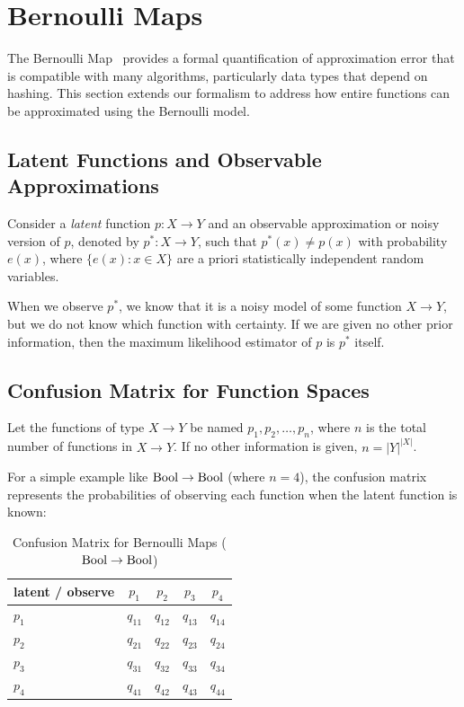 \documentclass[../main.tex]{subfiles}
\begin{document}
\section{Bernoulli Maps}
\label{sec:bernoulli_maps}

The Bernoulli Map~\cite{bernoulliMaps} provides a formal quantification of approximation error that is compatible with many algorithms, particularly data types that depend on hashing. This section extends our formalism to address how entire functions can be approximated using the Bernoulli model.

\subsection{Latent Functions and Observable Approximations}

Consider a \emph{latent} function $p : X \to Y$ and an observable approximation or noisy version of $p$, denoted by $p^* : X \to Y$, such that $p^*(x) \neq p(x)$ with probability $e(x)$, where $\{e(x) : x \in X\}$ are a priori statistically independent random variables.

When we observe $p^*$, we know that it is a noisy model of some function $X \to Y$, but we do not know which function with certainty. If we are given no other prior information, then the maximum likelihood estimator of $p$ is $p^*$ itself.

\subsection{Confusion Matrix for Function Spaces}

Let the functions of type $X \to Y$ be named $p_1, p_2, \ldots, p_n$, where $n$ is the total number of functions in $X \to Y$. If no other information is given, $n = |Y|^{|X|}$.

For a simple example like $\mathrm{Bool} \to \mathrm{Bool}$ (where $n = 4$), the confusion matrix represents the probabilities of observing each function when the latent function is known:

\begin{table}[htbp]
\centering
\caption{Confusion Matrix for Bernoulli Maps ($\mathrm{Bool} \to \mathrm{Bool}$)}
\label{tbl:bernoulli_maps_confusion}
\begin{tabular}{@{}lcccc@{}}
\toprule
\textbf{latent / observe} & $p_1$ & $p_2$ & $p_3$ & $p_4$ \\
\midrule
$p_1$ & $q_{11}$ & $q_{12}$ & $q_{13}$ & $q_{14}$ \\
$p_2$ & $q_{21}$ & $q_{22}$ & $q_{23}$ & $q_{24}$ \\
$p_3$ & $q_{31}$ & $q_{32}$ & $q_{33}$ & $q_{34}$ \\
$p_4$ & $q_{41}$ & $q_{42}$ & $q_{43}$ & $q_{44}$ \\
\bottomrule
\end{tabular}
\end{table}
\end{document}
